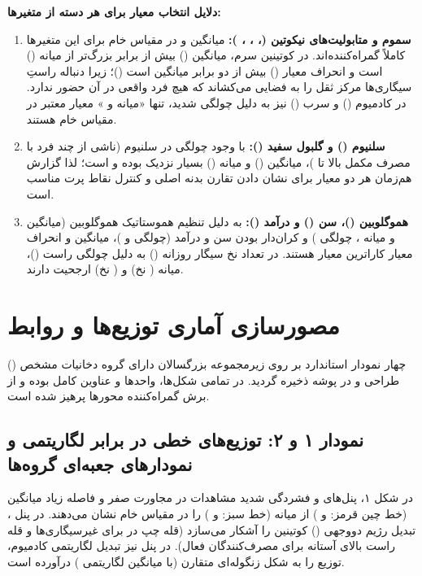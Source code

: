 \documentclass[12pt]{exam}
\begin{document}
\textbf{دلایل انتخاب معیار برای هر دسته از متغیرها:}
\begin{enumerate}
\item \textbf{سموم و متابولیت‌های نیکوتین (، ، ، ):} میانگین و  در مقیاس خام برای این متغیرها کاملاً گمراه‌کننده‌اند. در کوتینین سرم، میانگین () بیش از  برابر بزرگ‌تر از میانه () است و انحراف معیار () بیش از دو برابر میانگین است ()؛ زیرا دنباله راستِ سیگاری‌ها مرکز ثقل را به فضایی می‌کشاند که هیچ فرد واقعی در آن حضور ندارد. در کادمیوم () و سرب () نیز به دلیل چولگی شدید، تنها «میانه و » معیار معتبر در مقیاس خام هستند.
\item \textbf{سلنیوم () و گلبول سفید ():} با وجود چولگی  در سلنیوم (ناشی از چند فرد با مصرف مکمل بالا تا )، میانگین () و میانه () بسیار نزدیک بوده و  است؛ لذا گزارش هم‌زمان هر دو معیار برای نشان دادن تقارن بدنه اصلی و کنترل نقاط پرت مناسب است.
\item \textbf{هموگلوبین ()، سن () و درآمد ():} به دلیل تنظیم هموستاتیک هموگلوبین (میانگین  و میانه ، چولگی ) و کران‌دار بودن سن و درآمد (چولگی  و )، میانگین و انحراف معیار کاراترین معیار هستند. در تعداد نخ سیگار روزانه () به دلیل چولگی راست ()، میانه ( نخ) و  ( نخ) ارجحیت دارند.
\end{enumerate}


\section{مصورسازی آماری توزیع‌ها و روابط}

چهار نمودار استاندارد بر روی زیرمجموعه بزرگسالان دارای گروه دخانیات مشخص () طراحی و در پوشه  ذخیره گردید. در تمامی شکل‌ها، واحدها و عناوین کامل بوده و از برش گمراه‌کننده محورها پرهیز شده است.

\subsection{نمودار ۱ و ۲: توزیع‌های خطی در برابر لگاریتمی و نمودارهای جعبه‌ای گروه‌ها}
در شکل ۱، پنل‌های  و  فشردگی شدید مشاهدات در مجاورت صفر و فاصله زیاد میانگین (خط چین قرمز:  و ) از میانه (خط سبز:  و ) را در مقیاس خام نشان می‌دهند. در پنل ، تبدیل  رژیم دووجهی () کوتینین را آشکار می‌سازد (قله چپ در  برای غیرسیگاری‌ها و قله راست بالای آستانه  برای مصرف‌کنندگان فعال). در پنل  نیز تبدیل لگاریتمی کادمیوم، توزیع را به شکل زنگوله‌ای متقارن (با میانگین لگاریتمی ) درآورده است.
\end{document}
